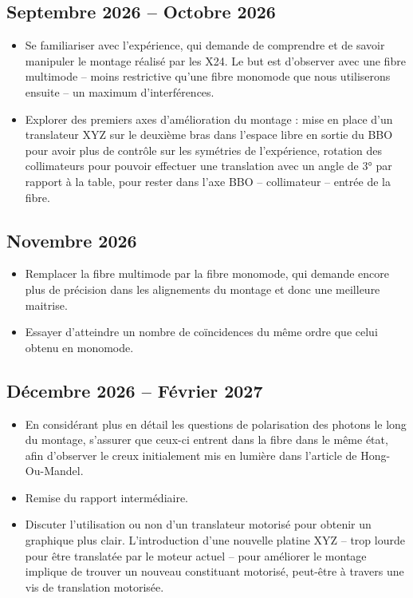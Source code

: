 \documentclass[a4paper, 12pt]{article}
\begin{document}
\subsection{Septembre 2026 -- Octobre 2026}

\begin{itemize}
    \item Se familiariser avec l’expérience, qui demande de comprendre et de savoir manipuler le montage réalisé par les X24. Le but est d’observer avec une fibre multimode -- moins restrictive qu’une fibre monomode que nous utiliserons ensuite -- un maximum d’interférences.
    \item Explorer des premiers axes d’amélioration du montage : mise en place d’un translateur XYZ sur le deuxième bras dans l’espace libre en sortie du BBO pour avoir plus de contrôle sur les symétries de l’expérience, rotation des collimateurs pour pouvoir effectuer une translation avec un angle de 3° par rapport à la table, pour rester dans l’axe BBO – collimateur – entrée de la fibre.
\end{itemize}

\subsection{Novembre 2026}

\begin{itemize}
    \item Remplacer la fibre multimode par la fibre monomode, qui demande encore plus de précision dans les alignements du montage et donc une meilleure maitrise.
    \item Essayer d’atteindre un nombre de coïncidences du même ordre que celui obtenu en monomode.
\end{itemize}

\subsection{Décembre 2026 -- Février 2027}

\begin{itemize}
    \item En considérant plus en détail les questions de polarisation des photons le long du montage, s’assurer que ceux-ci entrent dans la fibre dans le même état, afin d’observer le creux initialement mis en lumière dans l’article de Hong-Ou-Mandel.
    \item Remise du rapport intermédiaire.
    \item Discuter l’utilisation ou non d’un translateur motorisé pour obtenir un graphique plus clair. L’introduction d’une nouvelle platine XYZ – trop lourde pour être translatée par le moteur actuel -- pour améliorer le montage implique de trouver un nouveau constituant motorisé, peut-être à travers une vis de translation motorisée.
\end{itemize}
\end{document}
